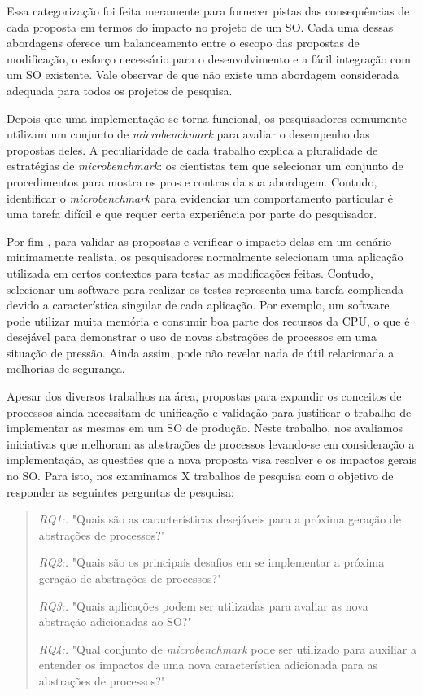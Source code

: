 Essa categorização foi feita meramente para fornecer pistas das consequências
de cada proposta em termos do impacto no projeto de um SO. Cada uma dessas
abordagens oferece um balanceamento entre o escopo das propostas de
modificação, o esforço necessário para o desenvolvimento e a fácil integração
com um SO existente. Vale observar de que não existe uma abordagem considerada
adequada para todos os projetos de pesquisa.

Depois que uma implementação se torna funcional, os pesquisadores comumente
utilizam um conjunto de \emph{microbenchmark} para avaliar o desempenho das
propostas deles. A peculiaridade de cada trabalho explica a pluralidade de
estratégias de \emph{microbenchmark}: os cientistas tem que selecionar um
conjunto de procedimentos para mostra os pros e contras da sua abordagem.
Contudo, identificar o \emph{microbenchmark} para evidenciar um comportamento
particular é uma tarefa difícil e que requer certa experiência por parte do
pesquisador.

Por fim , para validar as propostas e verificar o impacto delas em um cenário
minimamente realista, os pesquisadores normalmente selecionam uma aplicação
utilizada em certos contextos para testar as modificações feitas. Contudo,
selecionar um software para realizar os testes representa uma tarefa complicada
devido a característica singular de cada aplicação. Por exemplo, um software
pode utilizar muita memória e consumir boa parte dos recursos da CPU, o que é
desejável para demonstrar o uso de novas abstrações de processos em uma
situação de pressão. Ainda assim, pode não revelar nada de útil relacionada a
melhorias de segurança.

Apesar dos diversos trabalhos na área, propostas para expandir os conceitos de
processos ainda necessitam de unificação e validação para justificar o trabalho
de implementar as mesmas em um SO de produção. Neste trabalho, nos avaliamos
iniciativas que melhoram as abstrações de processos levando-se em consideração
a implementação, as questões que a nova proposta visa resolver e os impactos
gerais no SO. Para isto, nos examinamos X trabalhos de pesquisa com o objetivo
de responder as seguintes perguntas de pesquisa:

\begin{quote}
 \item \textit{RQ1:.} "Quais são as características desejáveis para a próxima geração de abstrações de processos?"
 \item \textit{RQ2:.} "Quais são os principais desafios em se implementar a próxima geração de abstrações de processos?"
 \item \textit{RQ3:.} "Quais aplicações podem ser utilizadas para avaliar as nova abstração adicionadas ao SO?"
 \item \textit{RQ4:.} "Qual conjunto de \emph{microbenchmark} pode ser utilizado para auxiliar a entender os impactos de uma nova característica adicionada para as abstrações de processos?"
\end{quote}

